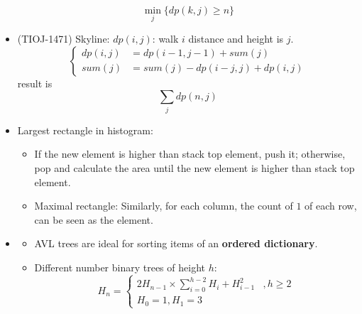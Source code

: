 \begin{itemize}
\begin{equation}
        \min_{j} \{dp(k, j) \ge n\}
    \end{equation}
    \item (TIOJ-1471) Skyline: $dp(i, j)$: walk $i$ distance and height is $j$. \begin{equation}
        \begin{cases}
            dp(i, j) & = dp(i - 1, j - 1) + sum(j) \\
            sum(j) & = sum(j) -dp(i - j, j) + dp(i, j)
        \end{cases}
    \end{equation} result is \begin{equation}
        \sum_{j}dp(n, j)
    \end{equation}
    \item Largest rectangle in histogram: \begin{itemize}
        \item If the new element is higher than stack top element, push it; otherwise, pop and calculate the area until the new element is higher than stack top element.
        \item Maximal rectangle: Similarly, for each column, the count of $1$ of each row, can be seen as the element.
    \end{itemize}
    \item \quad\quad \begin{itemize}
        \item AVL trees are ideal for sorting items of an \textbf{ordered dictionary}.
        \item Different number binary trees of height $h$: \begin{equation}
            H_n = \begin{cases}
                2H_{n - 1} \times \sum\limits_{i = 0}^{h - 2}H_i + H_{i - 1}^2 &, h \ge 2\\
                H_0 = 1, H_1 = 3 
            \end{cases}
        \end{equation}
    \end{itemize}
\end{itemize}

\pagebreak
